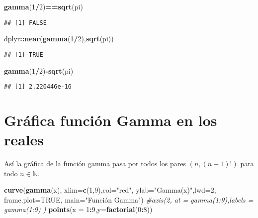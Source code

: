 \documentclass[
]{article}
\newenvironment{Shaded}{\begin{snugshade}}{\end{snugshade}}
\newcommand{\AttributeTok}[1]{\textcolor[rgb]{0.13,0.29,0.53}{#1}}
\newcommand{\CommentTok}[1]{\textcolor[rgb]{0.56,0.35,0.01}{\textit{#1}}}
\newcommand{\ConstantTok}[1]{\textcolor[rgb]{0.56,0.35,0.01}{#1}}
\newcommand{\DecValTok}[1]{\textcolor[rgb]{0.00,0.00,0.81}{#1}}
\newcommand{\FunctionTok}[1]{\textcolor[rgb]{0.13,0.29,0.53}{\textbf{#1}}}
\newcommand{\NormalTok}[1]{#1}
\newcommand{\SpecialCharTok}[1]{\textcolor[rgb]{0.81,0.36,0.00}{\textbf{#1}}}
\newcommand{\StringTok}[1]{\textcolor[rgb]{0.31,0.60,0.02}{#1}}
\begin{document}
\begin{Shaded}
\begin{Highlighting}[]
\FunctionTok{gamma}\NormalTok{(}\DecValTok{1}\SpecialCharTok{/}\DecValTok{2}\NormalTok{)}\SpecialCharTok{==}\FunctionTok{sqrt}\NormalTok{(pi)}
\end{Highlighting}
\end{Shaded}

\begin{verbatim}
## [1] FALSE
\end{verbatim}

\begin{Shaded}
\begin{Highlighting}[]
\NormalTok{dplyr}\SpecialCharTok{::}\FunctionTok{near}\NormalTok{(}\FunctionTok{gamma}\NormalTok{(}\DecValTok{1}\SpecialCharTok{/}\DecValTok{2}\NormalTok{),}\FunctionTok{sqrt}\NormalTok{(pi))}
\end{Highlighting}
\end{Shaded}

\begin{verbatim}
## [1] TRUE
\end{verbatim}

\begin{Shaded}
\begin{Highlighting}[]
\FunctionTok{gamma}\NormalTok{(}\DecValTok{1}\SpecialCharTok{/}\DecValTok{2}\NormalTok{)}\SpecialCharTok{{-}}\FunctionTok{sqrt}\NormalTok{(pi)}
\end{Highlighting}
\end{Shaded}

\begin{verbatim}
## [1] 2.220446e-16
\end{verbatim}

\section{Gráfica función Gamma en los
reales}\label{gruxe1fica-funciuxf3n-gamma-en-los-reales}

Así la gráfica de la función gamma pasa por todos los pares
\((n,(n-1)!)\) para todo \(n \in \mathbb{N}.\)

\begin{Shaded}
\begin{Highlighting}[]
\FunctionTok{curve}\NormalTok{(}\FunctionTok{gamma}\NormalTok{(x),}
      \AttributeTok{xlim=}\FunctionTok{c}\NormalTok{(}\DecValTok{1}\NormalTok{,}\DecValTok{9}\NormalTok{),}\AttributeTok{col=}\StringTok{"red"}\NormalTok{,}
      \AttributeTok{ylab=}\StringTok{"Gamma(x)"}\NormalTok{,}\AttributeTok{lwd=}\DecValTok{2}\NormalTok{,}
      \AttributeTok{frame.plot=}\ConstantTok{TRUE}\NormalTok{,}
      \AttributeTok{main=}\StringTok{"Función Gamma"}\NormalTok{)}
\CommentTok{\#axis(2, at = gamma(1:9),labels = gamma(1:9) )}
\FunctionTok{points}\NormalTok{(}\AttributeTok{x =} \DecValTok{1}\SpecialCharTok{:}\DecValTok{9}\NormalTok{,}\AttributeTok{y=}\FunctionTok{factorial}\NormalTok{(}\DecValTok{0}\SpecialCharTok{:}\DecValTok{8}\NormalTok{))}
\end{Highlighting}
\end{Shaded}
\end{document}
